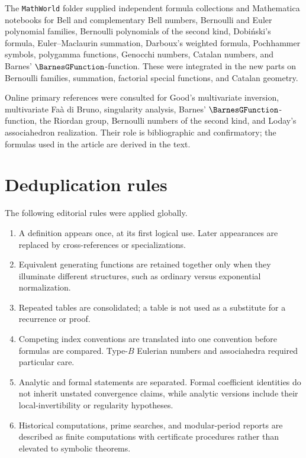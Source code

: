 \documentclass[11pt,a4paper,oneside,openany]{book}
\theoremstyle{definition}
\theoremstyle{remark}
\begin{document}
The \nolinkurl{MathWorld} folder supplied independent formula collections and
Mathematica notebooks for Bell and complementary Bell numbers, Bernoulli and
Euler polynomial families, Bernoulli polynomials of the second kind,
Dobi\'nski's formula, Euler--Maclaurin summation, Darboux's weighted formula,
Pochhammer symbols, polygamma functions, Genocchi numbers, Catalan numbers, and
Barnes' $\BarnesGFunction$-function. These were integrated in the new parts on Bernoulli
families, summation, factorial special functions, and Catalan geometry.

Online primary references were consulted for Good's multivariate inversion,
multivariate Fa\`a di Bruno, singularity analysis, Barnes' $\BarnesGFunction$-function, the
Riordan group, Bernoulli numbers of the second kind, and Loday's associahedron
realization. Their role is bibliographic and confirmatory; the formulas used in
the article are derived in the text.

\section{Deduplication rules}

\begin{auditbox}
The following editorial rules were applied globally.
\begin{enumerate}
\item A definition appears once, at its first logical use. Later appearances
      are replaced by cross-references or specializations.
\item Equivalent generating functions are retained together only when they
      illuminate different structures, such as ordinary versus exponential
      normalization.
\item Repeated tables are consolidated; a table is not used as a substitute
      for a recurrence or proof.
\item Competing index conventions are translated into one convention before
      formulas are compared. Type-$B$ Eulerian numbers and associahedra required
      particular care.
\item Analytic and formal statements are separated. Formal coefficient
      identities do not inherit unstated convergence claims, while analytic
      versions include their local-invertibility or regularity hypotheses.
\item Historical computations, prime searches, and modular-period reports are
      described as finite computations with certificate procedures rather than
      elevated to symbolic theorems.
\end{enumerate}
\end{auditbox}
\end{document}
